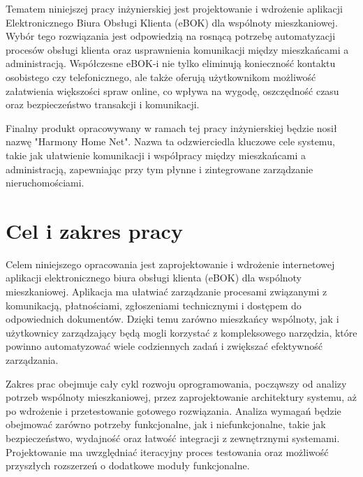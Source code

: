 Tematem niniejszej pracy inżynierskiej jest projektowanie i wdrożenie aplikacji Elektronicznego Biura Obsługi Klienta (eBOK) dla wspólnoty mieszkaniowej. Wybór tego rozwiązania jest odpowiedzią na rosnącą potrzebę automatyzacji procesów obsługi klienta oraz usprawnienia komunikacji między mieszkańcami a administracją. Współczesne eBOK-i nie tylko eliminują konieczność kontaktu osobistego czy telefonicznego, ale także oferują użytkownikom możliwość załatwienia większości spraw online, co wpływa na wygodę, oszczędność czasu oraz bezpieczeństwo transakcji i komunikacji.

Finalny produkt opracowywany w ramach tej pracy inżynierskiej będzie nosił nazwę "Harmony Home Net". Nazwa ta odzwierciedla kluczowe cele systemu, takie jak ułatwienie komunikacji i współpracy między mieszkańcami a administracją, zapewniając przy tym płynne i zintegrowane zarządzanie nieruchomościami.



\section{Cel i zakres pracy}


Celem niniejszego opracowania jest zaprojektowanie i wdrożenie internetowej aplikacji elektronicznego biura obsługi klienta (eBOK) dla wspólnoty mieszkaniowej. Aplikacja ma ułatwiać zarządzanie procesami związanymi z komunikacją, płatnościami, zgłoszeniami technicznymi i dostępem do odpowiednich dokumentów. Dzięki temu zarówno mieszkańcy wspólnoty, jak i użytkownicy zarządzający będą mogli korzystać z kompleksowego narzędzia, które powinno automatyzować wiele codziennych zadań i zwiększać efektywność zarządzania.

Zakres prac obejmuje cały cykl rozwoju oprogramowania, począwszy od analizy potrzeb wspólnoty mieszkaniowej, przez zaprojektowanie architektury systemu, aż po wdrożenie i przetestowanie gotowego rozwiązania. Analiza wymagań będzie obejmować zarówno potrzeby funkcjonalne, jak i niefunkcjonalne, takie jak bezpieczeństwo, wydajność oraz łatwość integracji z zewnętrznymi systemami. Projektowanie ma uwzględniać iteracyjny proces testowania oraz możliwość przyszłych rozszerzeń o dodatkowe moduły funkcjonalne.

